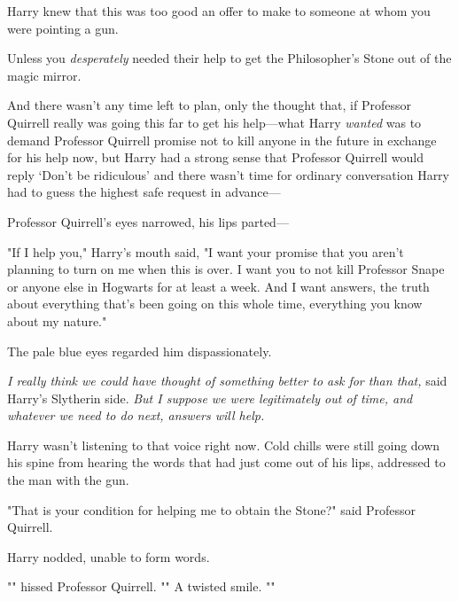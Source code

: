 Harry knew that this was too good an offer to make to someone at whom you were
pointing a gun.

Unless you \emph{desperately} needed their help to get the Philosopher's Stone
out of the magic mirror.

And there wasn't any time left to plan, only the thought that, if Professor
Quirrell really was going this far to get his help---what Harry \emph{wanted}
was to demand Professor Quirrell promise not to kill anyone in the future in
exchange for his help now, but Harry had a strong sense that Professor Quirrell
would reply `Don't be ridiculous' and there wasn't time for ordinary
conversation Harry had to guess the highest safe request in advance---

Professor Quirrell's eyes narrowed, his lips parted---

"If I help you," Harry's mouth said, "I want your promise that you aren't
planning to turn on me when this is over. I want you to not kill Professor
Snape or anyone else in Hogwarts for at least a week. And I want answers, the
truth about everything that's been going on this whole time, everything you
know about my nature."

The pale blue eyes regarded him dispassionately.

\emph{I really think we could have thought of something better to ask for than
that,} said Harry's Slytherin side. \emph{But I suppose we were legitimately
out of time, and whatever we need to do next, answers will help.}

Harry wasn't listening to that voice right now. Cold chills were still going
down his spine from hearing the words that had just come out of his lips,
addressed to the man with the gun.

"That is your condition for helping me to obtain the Stone?" said Professor
Quirrell.

Harry nodded, unable to form words.

"" hissed Professor Quirrell. "" A twisted smile.
""

